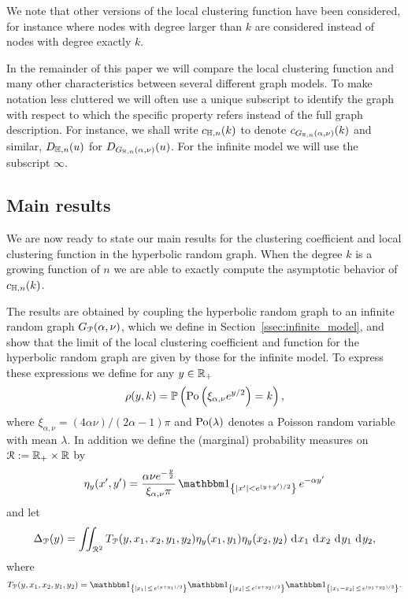 We note that other versions of the local clustering function have been considered, for instance where nodes with degree larger than $k$ are considered instead of nodes with degree exactly $k$.  

\begin{remark}\label{rmk:notation}
In the remainder of this paper we will compare the local clustering function and many other characteristics between several different graph models. To make notation less cluttered we will often use a unique subscript to identify the graph with respect to which the specific property refers instead of the full graph description. For instance, we shall write $c_{\mathbb{H},n}(k)$ to denote $c_{G_{\mathbb{H},n}(\alpha, \nu)}(k)$ and similar, $D_{\mathbb{H}, n}(u)$ for $D_{G_{\mathbb{H},n}(\alpha, \nu)}(u)$. For the infinite model we will use the subscript $\infty$.
\end{remark}


\subsection{Main results}\label{ssec:main_results}

We are now ready to state our main results for the clustering coefficient and local clustering function in the hyperbolic random graph. When the degree $k$ is a growing function of $n$ we are able to exactly compute the asymptotic behavior of $c_{\mathbb{H},n}(k)$. 

The results are obtained by coupling the hyperbolic random graph to an infinite random graph $G_{{\mathcal P}}(\alpha,\nu)$, which we define in Section~\ref{ssec:infinite_model}, and show that the limit of the local clustering coefficient and function for the hyperbolic random graph are given by those for the infinite model. To express these expressions we define for any $y \in {\ensuremath{\mathbb R}}_+$ 
\[
	\rho(y,k) = \mathbb{P}\left({\mathrm{Po}}\left(\xi_{\alpha,\nu} e^{y/2}\right) = k\right),
\]
where $\xi_{\alpha,\nu} = (4\alpha \nu)/(2\alpha - 1)\pi$ and ${\mathrm{Po}}(\lambda)$ denotes a Poisson random variable with mean $\lambda$. In addition we define the (marginal) probability measures on ${\mathcal R} := {\mathbb R}_+ \times {\ensuremath{\mathbb R}}$ by  
\[
	\eta_{y}(x^\prime, y^\prime) = \frac{\alpha \nu e^{-\frac{y}{2}}}{\xi_{\alpha,\nu} \pi} \, \ind{|x^\prime|<e^{(y+y^\prime)/2}} \, e^{-\alpha y^\prime}
\]	
and let
\begin{equation}\label{eq:def_delta_p}
	\Delta_{{\mathcal P}}(y) = \iint_{{\mathcal R}^2} T_{{\mathcal P}}(y, x_1, x_2, y_1, y_2) \eta_{y}(x_1,y_1)\eta_{y}(x_2,y_2) \operatorname{\, \mathrm{d}\hspace{-1pt}} x_1 \operatorname{\, \mathrm{d}\hspace{-1pt}} x_2  \operatorname{\, \mathrm{d}\hspace{-1pt}} y_1  \operatorname{\, \mathrm{d}\hspace{-1pt}} y_2,
\end{equation}
where 
\[
	T_\Pcal(y, x_1, x_2, y_1, y_2) 
	= \ind{|x_1| \, \le \, e^{(y+y_1)/2}}\ind{|x_2| \, \le \, e^{(y+y_2)/2}}\ind{|x_1-x_2| \, \le \, e^{(y_1+y_2)/2}}.
\]

